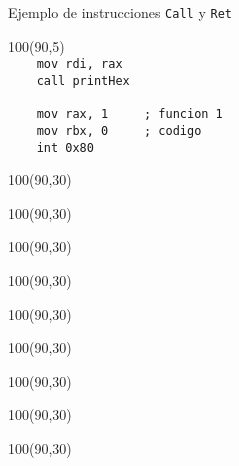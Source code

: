\documentclass[aspectratio=169]{beamer}
\begin{document}
\begin{frame}[fragile]{Ejemplo de instrucciones \texttt{Call} y \texttt{Ret}}
    \begin{textblock}{100}(90,5)
    \scriptsize
    \verb|                                 |\\ 
    \verb|    mov rdi, rax                 |\\ 
    \verb|    call printHex                |\\ 
    \verb|                                 |\\ 
    \verb|    mov rax, 1     ; funcion 1   |\\ 
    \verb|    mov rbx, 0     ; codigo      |\\ 
    \verb|    int 0x80                     |\\ 
    \end{textblock}
    \begin{textblock}{100}(90,30)   \end{textblock} %
    \begin{textblock}{100}(90,30)   \end{textblock} %
    \begin{textblock}{100}(90,30)   \end{textblock} %
    \begin{textblock}{100}(90,30)   \end{textblock} %
    \begin{textblock}{100}(90,30)   \end{textblock} %
    \begin{textblock}{100}(90,30)   \end{textblock} %
    \begin{textblock}{100}(90,30)   \end{textblock} %
    \begin{textblock}{100}(90,30)   \end{textblock} %
    \begin{textblock}{100}(90,30)   \end{textblock} %

\end{frame}
\end{document}

